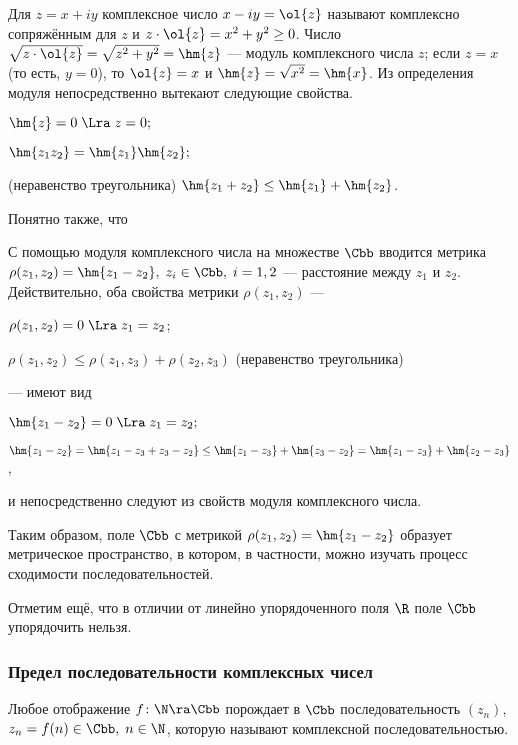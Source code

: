 \documentclass[a4paper]{article}
\begin{document}
Для $z=x+iy$ комплексное число $x-iy=\ol{z}$ называют комплексно
сопряжённым для $z$ и $z\cdot\ol{z} = x^2+y^2 \ge0$. Число
$\sqrt{z\cdot\ol{z}} = \sqrt{z^2+y^2}=\hm{z}$ --- модуль
комплексного числа $z$; если $z=x$ (то есть, $y=0$), то $\ol{z}=x$ и
$\hm{z} = \sqrt{x^2}=\hm{x}$. Из определения модуля непосредственно
вытекают следующие свойства.

\begin{nums}{-2}
\item $\hm{z}=0 \; \Lra \; z=0;$
\item $\hm{z_1z_2}=\hm{z_1}\hm{z_2};$
\item (неравенство треугольника) $\hm{z_1+z_2} \le
\hm{z_1}+\hm{z_2}$.
\end{nums}

Понятно также, что 

С помощью модуля комплексного числа на множестве $\Cbb$ вводится
метрика $\rho(z_1,z_2) = \hm{z_1-z_2}, \; z_i\in\Cbb, \; i=1,2$ ---
расстояние между $z_1$ и $z_2$. Действительно, оба свойства метрики
$\rho(z_1,z_2)$ ---
\begin{nums}{-2}
\item $\rho(z_1,z_2)=0 \; \Lra \; z_1=z_2$;
\item $\rho(z_1,z_2) \le \rho(z_1,z_3) + \rho(z_2,z_3)$ (неравенство
треугольника)
\end{nums}
--- имеют вид
\begin{nums}{-2}
\item $\hm{z_1-z_2}=0 \; \Lra \; z_1=z_2;$
\item $\hm{z_1-z_2} = \hm{z_1-z_3+z_3-z_2} \le \hm{z_1-z_3} +
\hm{z_3-z_2} = \hm{z_1-z_3} + \hm{z_2-z_3}$,
\end{nums}
и непосредственно следуют из свойств модуля комплексного числа.

Таким образом, поле $\Cbb$ с метрикой $\rho(z_1,z_2) = \hm{z_1-z_2}$
образует метрическое пространство, в котором, в частности, можно
изучать процесс сходимости последовательностей.

Отметим ещё, что в отличии от линейно упорядоченного поля $\R$ поле
$\Cbb$ упорядочить нельзя.

\subsubsection{Предел последовательности комплексных чисел}
Любое отображение $f\colon \N\ra\Cbb$ порождает в $\Cbb$
последовательность $(z_n)$, $z_n=f(n) \in \Cbb, \; n\in\N$, которую
называют комплексной последовательностью.
\end{document}
